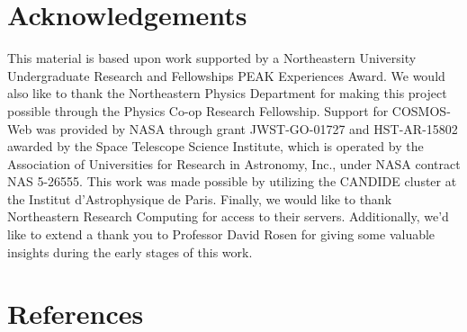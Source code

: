 \documentclass[10pt,a4paper,onecolumn]{article}
\let\textttOrig=\texttt
\def\texttt#1{\expandafter\textttOrig{\seqsplit{#1}}}
\let\addcontentslineOrig=\addcontentsline
\def\addcontentsline#1#2#3{\bgroup
  \let\texttt=\textttOrig\addcontentslineOrig{#1}{#2}{#3}\egroup}
\begin{document}
\hypertarget{acknowledgements}{%
\section{Acknowledgements}\label{acknowledgements}}

This material is based upon work supported by a Northeastern University
Undergraduate Research and Fellowships PEAK Experiences Award. We would
also like to thank the Northeastern Physics Department for making this
project possible through the Physics Co-op Research Fellowship. Support
for COSMOS-Web was provided by NASA through grant JWST-GO-01727 and
HST-AR-15802 awarded by the Space Telescope Science Institute, which is
operated by the Association of Universities for Research in Astronomy,
Inc., under NASA contract NAS 5-26555. This work was made possible by
utilizing the CANDIDE cluster at the Institut d'Astrophysique de Paris.
Finally, we would like to thank Northeastern Research Computing for
access to their servers. Additionally, we'd like to extend a thank you
to Professor David Rosen for giving some valuable insights during the
early stages of this work.

\hypertarget{references}{%
\section*{References}\label{references}}
\end{document}

